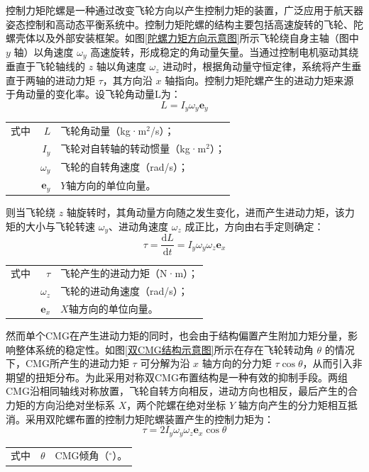 控制力矩陀螺是一种通过改变飞轮方向以产生控制力矩的装置，广泛应用于航天器姿态控制和高动态平衡系统中。控制力矩陀螺的结构主要包括高速旋转的飞轮、陀螺壳体以及外部安装框架。如图\ref{陀螺力矩方向示意图}所示飞轮绕自身主轴（图中 $y$ 轴）以角速度 $\omega_y$ 高速旋转，形成稳定的角动量矢量。当通过控制电机驱动其绕垂直于飞轮轴线的 $z$ 轴以角速度 $\omega_z$ 进动时，根据角动量守恒定律，系统将产生垂直于两轴的进动力矩 $\tau$，其方向沿 $x$ 轴指向。控制力矩陀螺产生的进动力矩来源于角动量的变化率。设飞轮角动量L为：
\begin{equation}
L = I_y \omega_y \mathbf{e}_y
\end{equation}
\begin{tabularx}{\textwidth}{@{}l@{\quad}r@{———}X@{}}
式中& $L$ & 飞轮角动量（kg·m$^2$/s）；\\
& $I_y$ & 飞轮对自转轴的转动惯量（kg·m$^2$）；\\
& $\omega_y$ & 飞轮的自转角速度（rad/s）；\\
& $\mathbf{e}_y$ & $Y$轴方向的单位向量。\\
\end{tabularx}\vspace{3.15bp}

则当飞轮绕 $z$ 轴旋转时，其角动量方向随之发生变化，进而产生进动力矩，该力矩的大小与飞轮转速 $\omega_y$、进动角速度 $\omega_z$ 成正比，方向由右手定则确定：
\begin{equation}
\tau = \frac{\mathrm{d}L}{\mathrm{d}t} = I_y \omega_y \omega_z \mathbf{e}_x
\end{equation}
\begin{tabularx}{\textwidth}{@{}l@{\quad}r@{———}X@{}}
式中& $\tau$ & 飞轮产生的进动力矩（N·m）；\\
& $\omega_z$ & 飞轮的进动角速度（rad/s）；\\
& $\mathbf{e}_x$ & $X$轴方向的单位向量。\\
\end{tabularx}\vspace{3.15bp}

然而单个CMG在产生进动力矩的同时，也会由于结构偏置产生附加力矩分量，影响整体系统的稳定性。如图\ref{双CMG结构示意图}所示在存在飞轮转动角 $\theta$ 的情况下，CMG所产生的进动力矩 $\tau$ 可分解为沿 $x$ 轴方向的分力矩 $\tau \cos\theta$，从而引入非期望的扭矩分布。为此采用对称双CMG布置结构是一种有效的抑制手段。两组CMG沿相同轴线对称放置，飞轮自转方向相反，进动方向也相反，最后产生的合力矩的方向沿绝对坐标系 $X$，两个陀螺在绝对坐标 $Y$ 轴方向产生的分力矩相互抵消。采用双陀螺布置的控制力矩陀螺装置产生的控制力矩为：
\begin{equation}
\tau = 2 I_y \omega_y \omega_z \mathbf{e}_x \cos\theta
\label{eq:ch2-cmg-double}
\end{equation}
\begin{tabularx}{\textwidth}{@{}l@{\quad}r@{———}X@{}}
式中& $\theta$ & CMG倾角（$^\circ$）。\\
\end{tabularx}\vspace{3.15bp}

